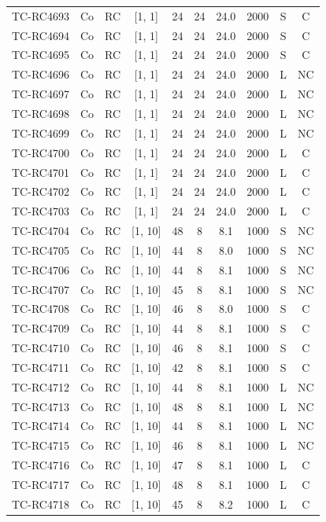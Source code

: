 \begin{longtable}{lccccccccc}
TC-RC4693 & Co & RC & [1, 1] & 24 & 24 & 24.0 & 2000 & S & C \\
TC-RC4694 & Co & RC & [1, 1] & 24 & 24 & 24.0 & 2000 & S & C \\
TC-RC4695 & Co & RC & [1, 1] & 24 & 24 & 24.0 & 2000 & S & C \\
TC-RC4696 & Co & RC & [1, 1] & 24 & 24 & 24.0 & 2000 & L & NC \\
TC-RC4697 & Co & RC & [1, 1] & 24 & 24 & 24.0 & 2000 & L & NC \\
TC-RC4698 & Co & RC & [1, 1] & 24 & 24 & 24.0 & 2000 & L & NC \\
TC-RC4699 & Co & RC & [1, 1] & 24 & 24 & 24.0 & 2000 & L & NC \\
TC-RC4700 & Co & RC & [1, 1] & 24 & 24 & 24.0 & 2000 & L & C \\
TC-RC4701 & Co & RC & [1, 1] & 24 & 24 & 24.0 & 2000 & L & C \\
TC-RC4702 & Co & RC & [1, 1] & 24 & 24 & 24.0 & 2000 & L & C \\
TC-RC4703 & Co & RC & [1, 1] & 24 & 24 & 24.0 & 2000 & L & C \\
TC-RC4704 & Co & RC & [1, 10] & 48 & 8 & 8.1 & 1000 & S & NC \\
TC-RC4705 & Co & RC & [1, 10] & 44 & 8 & 8.0 & 1000 & S & NC \\
TC-RC4706 & Co & RC & [1, 10] & 44 & 8 & 8.1 & 1000 & S & NC \\
TC-RC4707 & Co & RC & [1, 10] & 45 & 8 & 8.1 & 1000 & S & NC \\
TC-RC4708 & Co & RC & [1, 10] & 46 & 8 & 8.0 & 1000 & S & C \\
TC-RC4709 & Co & RC & [1, 10] & 44 & 8 & 8.1 & 1000 & S & C \\
TC-RC4710 & Co & RC & [1, 10] & 46 & 8 & 8.1 & 1000 & S & C \\
TC-RC4711 & Co & RC & [1, 10] & 42 & 8 & 8.1 & 1000 & S & C \\
TC-RC4712 & Co & RC & [1, 10] & 44 & 8 & 8.1 & 1000 & L & NC \\
TC-RC4713 & Co & RC & [1, 10] & 48 & 8 & 8.1 & 1000 & L & NC \\
TC-RC4714 & Co & RC & [1, 10] & 44 & 8 & 8.1 & 1000 & L & NC \\
TC-RC4715 & Co & RC & [1, 10] & 46 & 8 & 8.1 & 1000 & L & NC \\
TC-RC4716 & Co & RC & [1, 10] & 47 & 8 & 8.1 & 1000 & L & C \\
TC-RC4717 & Co & RC & [1, 10] & 48 & 8 & 8.1 & 1000 & L & C \\
TC-RC4718 & Co & RC & [1, 10] & 45 & 8 & 8.2 & 1000 & L & C \\

\end{longtable}
